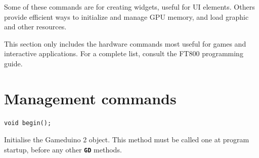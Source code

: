 \documentclass[10pt]{book}
\makeatletter
\newcommand{\gdtwo}{Gameduino 2 }
\newcommand{\mach}[1]{\texttt{\textbf{#1}}}
\newcommand{\cmdidx}[1]{
\index{#1@\mach{#1()}}
}
\newcommand{\cmd}[1]{\cmdidx{cmd\_#1}\nameref{cmd:#1}}
\makeatother
\begin{document}

Some of these commands 
are for creating widgets, useful for UI elements.
Others provide efficient ways to initialize and manage GPU memory,
and load graphic and other resources.

This section only includes the hardware commands
most useful for games and interactive applications.
For a complete list, consult the FT800 programming guide.

\newcommand{\highcmd}[2]{
\section{\texttt{cmd\_#1}}
\label{cmd:#1}
\index{cmd\_#1@\mach{cmd\_#1()}|boldindex}
}



\newcommand{\cmd}[1]{
\section{\texttt{#1}}
\label{#1}
}

\chapter{Management commands}


\begin{framed}
\begin{verbatim}
void begin();
\end{verbatim}
\end{framed}

Initialise the \gdtwo object.
This method must be called one at program startup, before any other \mach{GD} methods.

\end{document}
